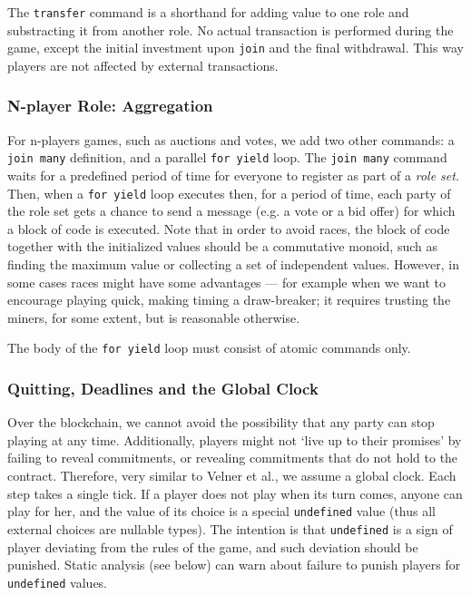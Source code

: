 \documentclass[acmsmall,review,anonymous]{acmart}\settopmatter{printfolios=true,printccs=false,printacmref=false}
\begin{document}
The \texttt{transfer} command is a shorthand for adding value to one role and substracting it from another role. No actual transaction is performed during the game, except the initial investment upon \texttt{join} and the final withdrawal. This way players are not affected by external transactions. 

\subsubsection{N-player Role: Aggregation}

For n-players games, such as auctions and votes, we add two other commands: a \texttt{join many} definition, and a parallel \texttt{for yield} loop. The \texttt{join many} command waits for a predefined period of time for everyone to register as part of a \textit{role set}. Then, when a \texttt{for yield} loop executes then, for a period of time, each party of the role set gets a chance to send a message (e.g. a vote or a bid offer) for which a block of code is executed. Note that in order to avoid races, the block of code together with the initialized values should be a commutative monoid, such as finding the maximum value or collecting a set of independent values. However, in some cases races might have some advantages --- for example when we want to encourage playing quick, making timing a draw-breaker; it requires trusting the miners, for some extent, but is reasonable otherwise.

The body of the \texttt{for yield} loop must consist of atomic commands only. 

\subsubsection{Quitting, Deadlines and the Global Clock}
Over the blockchain, we cannot avoid the possibility that any party can stop playing at any time. Additionally, players might not `live up to their promises' by failing to reveal commitments, or revealing commitments that do not hold to the contract.
Therefore, very similar to Velner et al., we assume a global clock. Each step takes a single tick. If a player does not play when its turn comes, anyone can play for her, and the value of its choice is a special \texttt{undefined} value (thus all external choices are nullable types). The intention is that \texttt{undefined} is a sign of player deviating from the rules of the game, and such deviation should be punished. Static analysis (see below) can warn about failure to punish players for \texttt{undefined} values.
\end{document}
